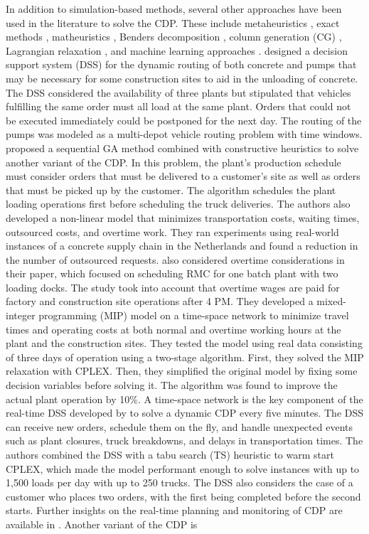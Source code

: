 \documentclass{article}
\begin{document}
In addition to simulation-based methods, several other approaches have been used in the literature to solve the CDP. These include metaheuristics \citep{misir2011selection, maghrebi2016sequential, yang2022concrete}, exact methods \citep{asbach2009analysis, kinable2014concrete}, matheuristics \citep{schmid2009hybrid, schmid2010hybridization}, Benders decomposition \citep{maghrebi2014benders}, column generation (CG) \citep{maghrebi2014solving}, Lagrangian relaxation \citep{narayanan2015using}, and machine learning approaches \citep{graham2006modeling}. \cite{matsatsinis2004towards} designed a decision support system (DSS) for the dynamic routing of both concrete and pumps that may be necessary for some construction sites to aid in the unloading of concrete. The DSS considered the availability of three plants but stipulated that vehicles fulfilling the same order must all load at the same plant. Orders that could not be executed immediately could be postponed for the next day. The routing of the pumps was modeled as a multi-depot vehicle routing problem with time windows. \cite{naso2007genetic} proposed a sequential GA method combined with constructive heuristics to solve another variant of the CDP. In this problem, the plant's production schedule must consider orders that must be delivered to a customer's site as well as orders that must be picked up by the customer. The algorithm schedules the plant loading operations first before scheduling the truck deliveries. The authors also developed a non-linear model that minimizes transportation costs, waiting times, outsourced costs, and overtime work. They ran experiments using real-world instances of a concrete supply chain in the Netherlands and found a reduction in the number of outsourced requests. \cite{yan2007optimal} also considered overtime considerations in their paper, which focused on scheduling RMC for one batch plant with two loading docks. The study took into account that overtime wages are paid for factory and construction site operations after 4 PM. They developed a mixed-integer programming (MIP) model on a time-space network to minimize travel times and operating costs at both normal and overtime working hours at the plant and the construction sites. They tested the model using real data consisting of three days of operation using a two-stage algorithm. First, they solved the MIP relaxation with CPLEX. Then, they simplified the original model by fixing some decision variables before solving it. The algorithm was found to improve the actual plant operation by 10\%. A time-space network is the key component of the real-time DSS developed by \cite{durbin2008or} to solve a dynamic CDP every five minutes. The DSS can receive new orders, schedule them on the fly, and handle unexpected events such as plant closures, truck breakdowns, and delays in transportation times. The authors combined the DSS with a tabu search (TS) heuristic to warm start CPLEX, which made the model performant enough to solve instances with up to 1,500 loads per day with up to 250 trucks. The DSS also considers the case of a customer who places two orders, with the first being completed before the second starts. Further insights on the real-time planning and monitoring of CDP are available in \cite{garza2021dynamic}. Another variant of the CDP is 
\end{document}
